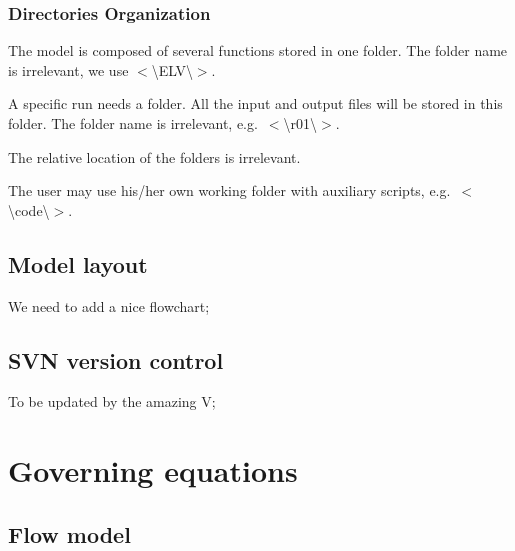 \documentclass[a4paper, 11pt]{article}
\newcommand{\pathdir}[1]{$<$\textbackslash#1\textbackslash$>$}
\begin{document}
\subsubsection{Directories Organization}
%
The model is composed of several functions stored in one folder. The folder name is irrelevant, we use \pathdir{ELV}.

A specific run needs a folder. All the input and output files will be stored in this folder. The folder name is irrelevant, e.g.\ \pathdir{r01}. 

The relative location of the folders is irrelevant.

The user may use his/her own working folder with auxiliary scripts, e.g.\ \pathdir{code}.


\subsection{Model layout}
We need to add a nice flowchart; 

%
%

\subsection{SVN version control}
To be updated by the amazing V;
%
%
%

\clearpage



































%
%
%
\clearpage
\section{Governing equations}
\subsection{Flow model}
\end{document}
